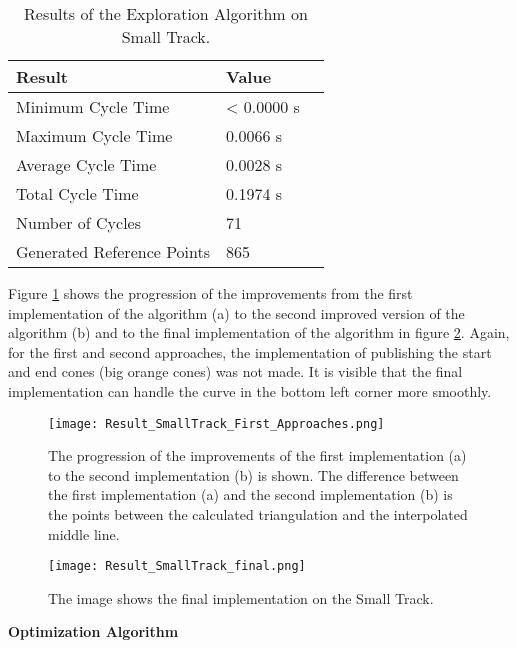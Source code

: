 \begin{table}[H]
    \centering
    \begin{tabular}{|l|l|l|}
        \hline
        \textbf{Result}            & \textbf{Value} \\ \hline
        Minimum Cycle Time         & < 0.0000 s     \\ \hline
        Maximum Cycle Time         & 0.0066 s       \\ \hline
        Average Cycle  Time        & 0.0028 s       \\ \hline
        Total Cycle Time           & 0.1974 s       \\ \hline
        Number of Cycles           & 71             \\ \hline
        Generated Reference Points & 865            \\ \hline
    \end{tabular}
    \caption{Results of the Exploration Algorithm on Small Track.}
    \label{tab:Results Small Track Exploration}
\end{table}

Figure \ref{fig:Result Small Track First Approaches} shows the progression of the improvements from the first implementation of the algorithm (a) to the second improved version of the algorithm (b) and to the final implementation of the algorithm in figure \ref{fig:Result Small Track Final}. Again, for the first and second approaches, the implementation of publishing the start and end cones (big orange cones) was not made. It is visible that the final implementation can handle the curve in the bottom left corner more smoothly.
\begin{figure}[H]
    \centering
    \texttt{[image: Result\_SmallTrack\_First\_Approaches.png]}
    \caption{The progression of the improvements of the first implementation (a) to the second implementation (b) is shown. The difference between the first implementation (a) and the second implementation (b) is the points between the calculated triangulation and the interpolated middle line.}
    \label{fig:Result Small Track First Approaches}
\end{figure}
\begin{figure}[H]
    \centering
    \texttt{[image: Result\_SmallTrack\_final.png]}
    \caption{The image shows the final implementation on the Small Track.}
    \label{fig:Result Small Track Final}
\end{figure}

\textbf{Optimization Algorithm}

